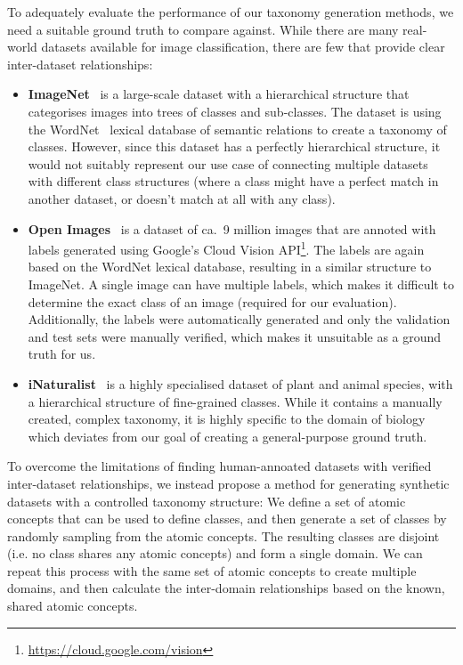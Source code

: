To adequately evaluate the performance of our taxonomy generation methods,
we need a suitable ground truth to compare against.
While there are many real-world datasets available for image classification,
there are few that provide clear inter-dataset relationships:
\begin{itemize}
    \item \textbf{ImageNet}~\cite{deng_imagenet_2009,russakovsky_imagenet_2015}
          is a large-scale dataset with a hierarchical structure that categorises
          images into trees of classes and sub-classes.
          The dataset is using the WordNet~\cite{fellbaum_wordnet_1998} lexical
          database of semantic relations to create a taxonomy of classes.
          However, since this dataset has a perfectly hierarchical structure,
          it would not suitably represent our use case of connecting
          multiple datasets with different class structures
          (where a class might have a perfect match in another dataset,
          or doesn't match at all with any class).
    \item \textbf{Open Images}~\cite{kuznetsova_open_2020} is a dataset of
          ca.~9 million images that are annoted with labels generated using
          Google's Cloud Vision API\footnote{\url{https://cloud.google.com/vision}}.
          The labels are again based on the WordNet lexical database,
          resulting in a similar structure to ImageNet.
          A single image can have multiple labels,
          which makes it difficult to determine the exact class of an image
          (required for our evaluation).
          Additionally, the labels were automatically generated
          and only the validation and test sets were manually verified,
          which makes it unsuitable as a ground truth for us.
    \item \textbf{iNaturalist}~\cite{horn_inaturalist_2018} is a highly
          specialised dataset of plant and animal species,
          with a hierarchical structure of fine-grained classes.
          While it contains a manually created, complex taxonomy,
          it is highly specific to the domain of biology
          which deviates from our goal of creating a general-purpose ground truth.
\end{itemize}

To overcome the limitations of finding human-annoated datasets
with verified inter-dataset relationships,
we instead propose a method for generating synthetic datasets
with a controlled taxonomy structure:
We define a set of atomic concepts that can be used to define classes,
and then generate a set of classes by randomly sampling from the atomic concepts.
The resulting classes are disjoint (i.e. no class shares any atomic concepts)
and form a single domain.
We can repeat this process with the same set of atomic concepts
to create multiple domains,
and then calculate the inter-domain relationships based on the known, shared atomic concepts.

